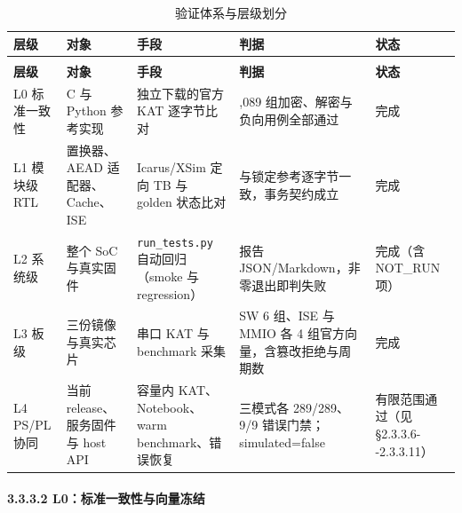 {\small
\renewcommand{\thetable}{3-6}
\begin{longtable}{@{}>{\raggedright\arraybackslash}p{}>{\raggedright\arraybackslash}p{}>{\raggedright\arraybackslash}p{}>{\raggedright\arraybackslash}p{}>{\raggedright\arraybackslash}p{}@{}}
\caption{验证体系与层级划分}\label{tab:3-6}\\
\toprule
\textbf{层级} & \textbf{对象} & \textbf{手段} & \textbf{判据} & \textbf{状态} \\
\midrule
\endfirsthead
\multicolumn{5}{@{}l}{\footnotesize 续表 3-6}\\
\toprule
\textbf{层级} & \textbf{对象} & \textbf{手段} & \textbf{判据} & \textbf{状态} \\
\midrule
\endhead
L0 标准一致性 & C 与 Python 参考实现 & 独立下载的官方 KAT 逐字节比对 & 1,089 组加密、解密与负向用例全部通过 & 完成 \\
L1 模块级 RTL & 置换器、AEAD 适配器、Cache、ISE & Icarus/XSim 定向 TB 与 golden 状态比对 & 与锁定参考逐字节一致，事务契约成立 & 完成 \\
L2 系统级 & 整个 SoC 与真实固件 & \texttt{run\_\allowbreak{}\allowbreak{}tests.\allowbreak{}py} 自动回归（smoke 与 regression） & 报告 JSON/Markdown，非零退出即判失败 & 完成（含 NOT\_\allowbreak{}RUN 项） \\
L3 板级 & 三份镜像与真实芯片 & 串口 KAT 与 benchmark 采集 & SW 6 组、ISE 与 MMIO 各 4 组官方向量，含篡改拒绝与周期数 & 完成 \\
L4 PS/PL 协同 & 当前 release、服务固件与 host API & 容量内 KAT、Notebook、warm benchmark、错误恢复 & 三模式各 289/289、9/9 错误门禁；simulated=false & 有限范围通过（见 §2.\allowbreak{}3.\allowbreak{}3.\allowbreak{}6-\allowbreak{}-\allowbreak{}2.\allowbreak{}3.\allowbreak{}3.\allowbreak{}11） \\
\bottomrule
\end{longtable}
}


\Needspace{85pt}

\paragraph{3.3.3.2 L0：标准一致性与向量冻结}\label{l0ux6807ux51c6ux4e00ux81f4ux6027ux4e0eux5411ux91cfux51bbux7ed3}

